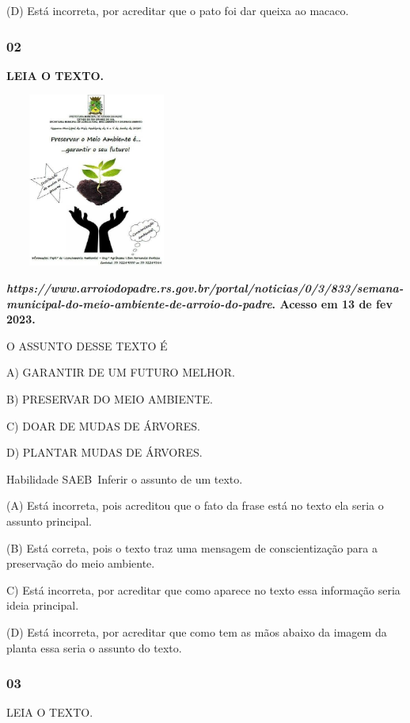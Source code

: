 (D) Está incorreta, por acreditar que o pato foi dar queixa ao macaco.

\subsubsection{02 }\label{section-17}

\textbf{LEIA O TEXTO.}

\includegraphics[width=2.37500in,height=2.25000in]{media/image166.jpg}

\textbf{\emph{https://www.arroiodopadre.rs.gov.br/portal/noticias/0/3/833/semana-municipal-do-meio-ambiente-de-arroio-do-padre}.
Acesso em 13 de fev 2023.}

O ASSUNTO DESSE TEXTO É

A) GARANTIR DE UM FUTURO MELHOR.

B) PRESERVAR DO MEIO AMBIENTE.

C) DOAR DE MUDAS DE ÁRVORES.

D) PLANTAR MUDAS DE ÁRVORES.

\protect\hypertarget{_heading=h.qsh70q}{}{}Habilidade SAEB~Inferir o
assunto de um texto.

(A) Está incorreta, pois acreditou que o fato da frase está no texto ela
seria o assunto principal.

(B) Está correta, pois o texto traz uma mensagem de conscientização para
a preservação do meio ambiente.

C) Está incorreta, por acreditar que como aparece no texto essa
informação seria ideia principal.

(D) Está incorreta, por acreditar que como tem as mãos abaixo da imagem
da planta essa seria o assunto do texto.

\subsubsection{03 }\label{section-18}

LEIA O TEXTO.

